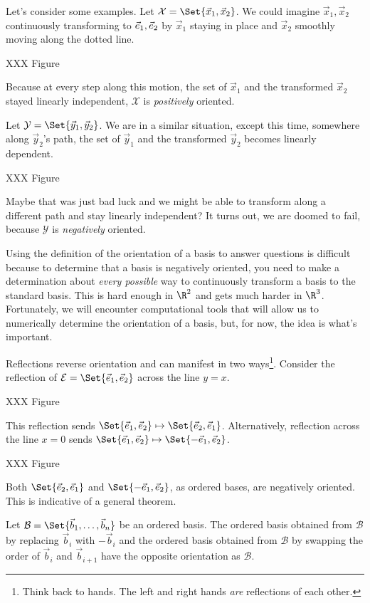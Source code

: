 Let's consider some examples. Let $\mathcal X=\Set{\vec x_1,\vec x_2}$. We could imagine $\vec x_1,\vec x_2$ continuously 
transforming to ${\vec e_1}, {\vec e_2}$ by $\vec x_1$ staying in place and $\vec x_2$ smoothly moving along the dotted
line.

XXX Figure

Because at every step along this motion, the set of $\vec x_1$ and the transformed $\vec x_2$ stayed linearly independent, $\mathcal X$ is
\emph{positively} oriented.

Let $\mathcal Y=\Set{\vec y_1,\vec y_2}$. We are in a similar situation, except this time, somewhere along $\vec y_2$'s path,
the set of $\vec y_1$ and the transformed $\vec y_2$ becomes linearly dependent.

XXX Figure

Maybe that was just bad luck and we might be able to transform along a different path and stay linearly independent?
It turns out, we are doomed to fail, because $\mathcal Y$ is \emph{negatively} oriented.

\bigskip

Using the definition of the orientation of a basis to answer questions is difficult because to determine
that a basis is negatively oriented, you need to make a determination about \emph{every possible} way 
to continuously transform a basis to the standard basis. This is hard enough in $\R^2$ and gets much harder
in $\R^3$. Fortunately, we will encounter computational tools that will allow us to numerically determine
the orientation of a basis, but, for now, the idea is what's important.


Reflections reverse orientation and can manifest in two ways\footnote{ Think back to hands. The left
and right hands \emph{are} reflections of each other.}.
Consider the reflection of $\mathcal E=\Set{\xhat, \yhat}$ across the line $y=x$.

XXX Figure

This reflection sends $\Set{\xhat,\yhat}\mapsto\Set{\yhat,\xhat}$. Alternatively, reflection across the line $x=0$ sends
$\Set{\xhat,\yhat}\mapsto\Set{-\xhat,\yhat}$. 

XXX Figure

Both $\Set{\yhat,\xhat}$ and $\Set{-\xhat,\yhat}$, as ordered bases,
are negatively oriented. This is indicative of a general theorem.

\begin{theorem}
	Let $\mathcal B=\Set{\vec b_1,\ldots,\vec b_n}$ be an ordered basis.
	The ordered basis obtained from $\mathcal B$ by replacing $\vec b_i$ with $-\vec b_i$
	and the ordered basis obtained from $\mathcal B$ by swapping the order of $\vec b_i$ and
	$\vec b_{i+1}$ have the opposite orientation as $\mathcal B$.
\end{theorem}





